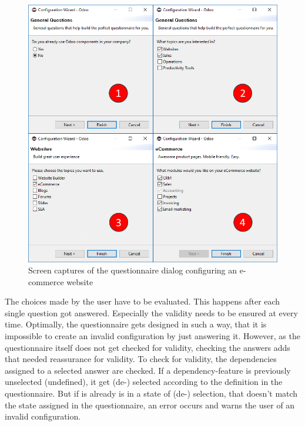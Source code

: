 \begin{figure}
	\includegraphics[width=\columnwidth]{img/img-screenshots.png}
	\caption{Screen captures of the questionnaire dialog configuring an e-commerce website}
	\label{img-screenshots}
\end{figure}

The choices made by the user have to be evaluated. This happens after each single question got answered. Especially the validity needs to be ensured at every time. Optimally, the questionnaire gets designed in such a way, that it is impossible to create an invalid configuration by just answering it. However, as the questionnaire itself does not get checked for validity, checking the answers adds that needed reassurance for validity. To check for validity, the dependencies assigned to a selected answer are checked. If a dependency-feature is previously unselected (undefined), it get (de-) selected according to the definition in the questionnaire. But if is already is in a state of (de-) selection, that doesn't match the state assigned in the questionnaire, an error occurs and warns the user of an invalid configuration.

